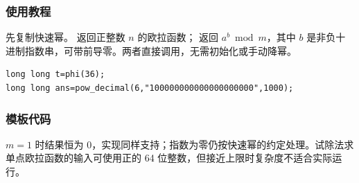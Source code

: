 \subsubsection*{使用教程}
先复制快速幂。 返回正整数 $n$ 的欧拉函数； 返回 $a^b\bmod m$，其中 $b$ 是非负十进制指数串，可带前导零。两者直接调用，无需初始化或手动降幂。
\begin{lstlisting}[style=mtycpp,numbers=none]
long long t=phi(36);
long long ans=pow_decimal(6,"100000000000000000000",1000);
\end{lstlisting}

\subsubsection*{模板代码}

$m=1$ 时结果恒为 $0$，实现同样支持；指数为零仍按快速幂的约定处理。试除法求单点欧拉函数的输入可使用正的 64 位整数，但接近上限时复杂度不适合实际运行。
